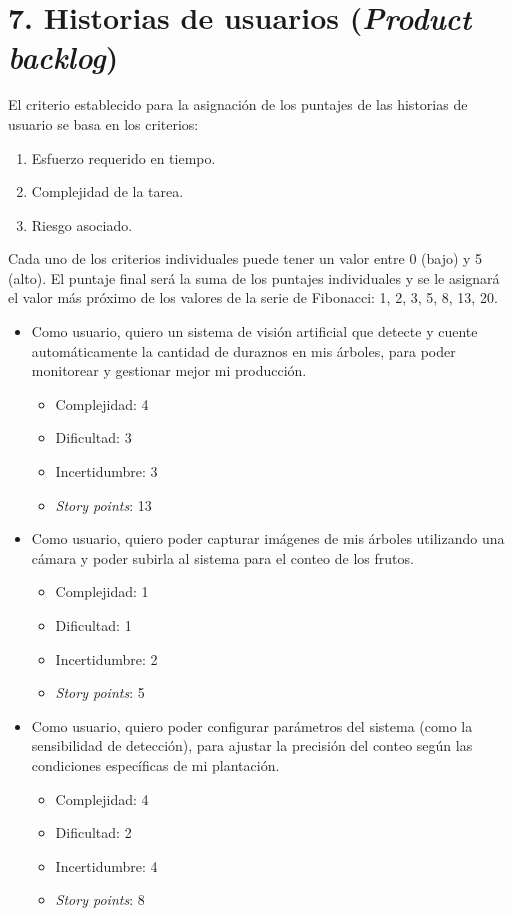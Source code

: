 \documentclass[
11pt %
]{charter}
\begin{document}
\section{7. Historias de usuarios (\textit{Product backlog})}
\label{sec:backlog}

El criterio establecido para la asignación de los puntajes de las historias de usuario se basa en los criterios:
\begin{enumerate}
	\item Esfuerzo requerido en tiempo.
	\item Complejidad de la tarea.
	\item Riesgo asociado.
\end{enumerate}
Cada uno de los criterios individuales puede tener un valor entre 0 (bajo) y 5 (alto). El puntaje final será la suma de los puntajes individuales y se le asignará el valor más próximo de los valores de la serie de Fibonacci: 1, 2, 3, 5, 8, 13, 20.

\begin{itemize}
\item Como usuario, quiero un sistema de visión artificial que detecte y cuente automáticamente la cantidad de duraznos en mis árboles, para poder monitorear y gestionar mejor mi producción.
	\begin{itemize}
	\item Complejidad: 4
	\item Dificultad: 3
	\item Incertidumbre: 3
	\item \textit{Story points}: 13 
	\end{itemize}
\end{itemize}

\begin{itemize}
\item Como usuario, quiero poder capturar imágenes de mis árboles utilizando una cámara y poder subirla al sistema para el conteo de los frutos.
	\begin{itemize}
	\item Complejidad: 1
	\item Dificultad: 1
	\item Incertidumbre: 2
	\item \textit{Story points}: 5 
	\end{itemize}
\end{itemize}

\begin{itemize}
\item Como usuario, quiero poder configurar parámetros del sistema (como la sensibilidad de detección), para ajustar la precisión del conteo según las condiciones específicas de mi plantación.
	\begin{itemize}
	\item Complejidad: 4
	\item Dificultad: 2
	\item Incertidumbre: 4
	\item \textit{Story points}: 8 
	\end{itemize}
\end{itemize}
\end{document}
